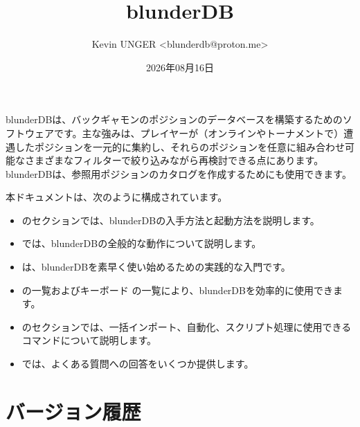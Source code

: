 \documentclass[letterpaper,10pt,dvipdfmx]{sphinxmanual}
\title{blunderDB}
\date{2026年08月16日}
\author{Kevin UNGER \textless{}blunderdb@proton.me\textgreater{}}
\begin{document}
\pagestyle{empty}
\sphinxmaketitle
\pagestyle{plain}
\sphinxtableofcontents
\pagestyle{normal}
\label{\detokenize{index::doc}}


\sphinxAtStartPar
blunderDBは、バックギャモンのポジションのデータベースを構築するためのソフトウェアです。主な強みは、プレイヤーが（オンラインやトーナメントで）遭遇したポジションを一元的に集約し、それらのポジションを任意に組み合わせ可能なさまざまなフィルターで絞り込みながら再検討できる点にあります。blunderDBは、参照用ポジションのカタログを作成するためにも使用できます。

\sphinxAtStartPar
本ドキュメントは、次のように構成されています。
\begin{itemize}
\item {} 
\sphinxAtStartPar
{} のセクションでは、blunderDBの入手方法と起動方法を説明します。

\item {} 
\sphinxAtStartPar
{} では、blunderDBの全般的な動作について説明します。

\item {} 
\sphinxAtStartPar
{} は、blunderDBを素早く使い始めるための実践的な入門です。

\item {} 
\sphinxAtStartPar
{} の一覧およびキーボード  の一覧により、blunderDBを効率的に使用できます。

\item {} 
\sphinxAtStartPar
{} のセクションでは、一括インポート、自動化、スクリプト処理に使用できるコマンドについて説明します。

\item {} 
\sphinxAtStartPar
{} では、よくある質問への回答をいくつか提供します。

\end{itemize}


\chapter{バージョン履歴}
\label{\detokenize{index:historique-des-versions}}
\end{document}
